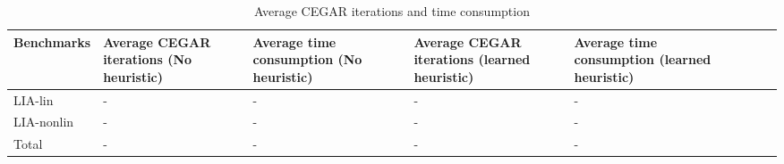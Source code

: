\documentclass{article}
\begin{document}
\begin{table}[h]
\begin{center}
\begin{tabular}{lp{3cm}p{3cm}p{3cm}p{3cm}p{3cm}p{3cm}p{3cm} }
\hline
Benchmarks  & Average CEGAR iterations (No heuristic) & Average time consumption (No heuristic) & Average CEGAR iterations (learned heuristic) & Average time consumption (learned heuristic) \\
\hline
LIA-lin  & - & - & -&-\\
LIA-nonlin  & - & - & -&-\\
Total  & - & - & -&-\\
\hline
\end{tabular}\caption{Average CEGAR iterations and time consumption}
\end{center}
\end{table}
%
%
%
%
%
%
%
%
\end{document}
